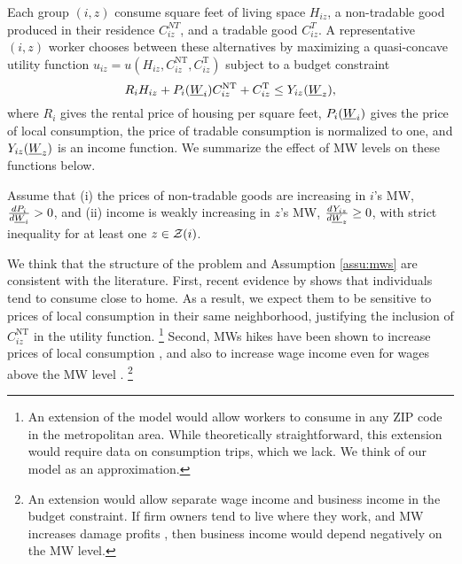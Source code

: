 Each group $(i,z)$ consume
square feet of living space $H_{iz}$, 
a non-tradable good produced in their residence $C_{iz}^{NT}$, and
a tradable good $C_{iz}^T$.
A representative $(i,z)$ worker chooses between these alternatives by maximizing
a quasi-concave utility function 
$u_{iz} = u \left(H_{iz}, C^{\text{NT}}_{iz}, C^{\text{T}}_{iz}\right)$
subject to a budget constraint
$$R_i H_{iz} + P_i(\underline{W}_i) C^{\text{NT}}_{iz} + C^{\text{T}}_{iz} \leq Y_{iz}(\underline{W}_z),$$
where
$R_i$ gives the rental price of housing per square feet,
$P_i(\underline{W}_i)$ gives the price of local consumption,
the price of tradable consumption is normalized to one, and 
$Y_{iz}(\underline{W}_z)$ is an income function.
We summarize the effect of MW levels on these functions below.

\begin{assu}\label{assu:mws}
    Assume that
    (i) the prices of non-tradable goods are increasing in $i$'s MW, 
    $\frac{d P_i}{d \underline{W}_i} > 0$, and
    (ii) income is weakly increasing in $z$'s MW, 
    $\frac{d Y_{iz}}{d \underline{W}_z} \geq 0$, with strict inequality 
    for at least one $z\in\mathcal{Z}(i)$.
\end{assu}

We think that the structure of the problem and
Assumption \ref{assu:mws} are consistent with the literature.
First, recent evidence by \textcite{MiyauchiEtAl2021} shows that individuals 
tend to consume close to home.
As a result, we expect them to be sensitive to prices of local consumption in 
their same neighborhood, justifying the inclusion of $C^{\text{NT}}_{iz}$ in the 
utility function.%
\footnote{An extension of the model would allow workers to consume in any ZIP 
code in the metropolitan area.
While theoretically straightforward, this extension would require data on 
consumption trips, which we lack.
We think of our model as an approximation.}
Second, MWs hikes have been shown to increase prices of local consumption 
\parencite[e.g.,][]{AllegrettoReich2018, Leung2021},
and also to increase wage income even for wages above the MW 
level \parencite[e.g.,][]{CegnizEtAl2019,Dube2019Income}.%
\footnote{An extension would allow separate wage income and business income in 
the budget constraint.
If firm owners tend to live where they work, and MW increases damage profits
\parencite[as found by, e.g.,][]{DracaMachinVanreenen2011, HarasztosiLidner2019},
then business income would depend negatively on the MW level.}

